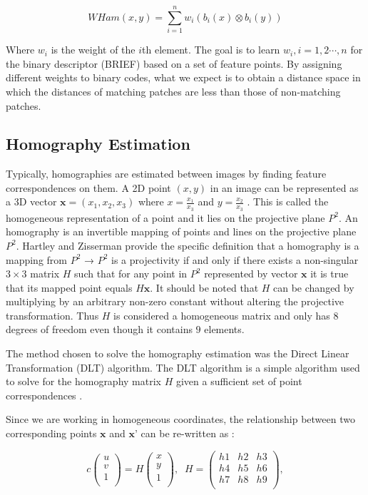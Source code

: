 $$WHam(x, y)=\sum_{i=1}^{n}w_i(b_i(x)\otimes b_i(y))$$

Where $w_i$ is the weight of the $i$th element. The goal is to learn $w_i,i=1,2\cdots,n$ for the binary descriptor (BRIEF) based on a set of feature points. By assigning different weights to binary codes, what we expect is to obtain a distance space in which the distances of matching patches are less than those of non-matching patches.


\subsection{Homography Estimation} %
\label{sub:tracking_library_for_the_web:marker_less_tracking_algorithm:homography_estimation}

Typically, homographies are estimated between images by finding feature correspondences on them. A 2D point $(x,y)$ in an image can be represented as a 3D vector $\textbf{x} = (x_1, x_2, x_3)$ where $x = \frac{x_1}{x_3}$ and $y = \frac{x_2}{x_3}$ \cite{Homography2009}. This is called the homogeneous representation of a point and it lies on the projective plane $P^2$. An homography is an invertible mapping of points and lines on the projective plane $P^2$. Hartley and Zisserman \cite{Hartley2004} provide the specific definition that a homography is a mapping from $P^2$ → $P^2$ is a projectivity if and only if there exists a non-singular $3\times3$ matrix $H$ such that for any point in $P^2$ represented by vector $\textbf{x}$ it is true that its mapped point equals $H\textbf{x}$. It should be noted that $H$ can be changed by multiplying by an arbitrary non-zero constant without altering the projective transformation. Thus $H$ is considered a homogeneous matrix and only has $8$ degrees of freedom even though it contains $9$ elements.

The method chosen to solve the homography estimation was the Direct Linear Transformation (DLT) \cite{Impa2009,Hartley2004} algorithm. The DLT algorithm is a simple algorithm used to solve for the homography matrix $H$ given a sufficient set of point correspondences \cite{Homography2009}.

Since we are working in homogeneous coordinates, the relationship between two corresponding points $\textbf{x}$ and $\textbf{x'}$ can be re-written as \cite{Homography2009}:

$$c\begin{pmatrix}u\\ v\\ 1\\\end{pmatrix} = H\begin{pmatrix}x\\ y\\ 1\\\end{pmatrix}, \;\; H=\begin{pmatrix}h1 & h2 & h3\\ h4 & h5 & h6\\ h7 & h8 & h9\\\end{pmatrix},$$

